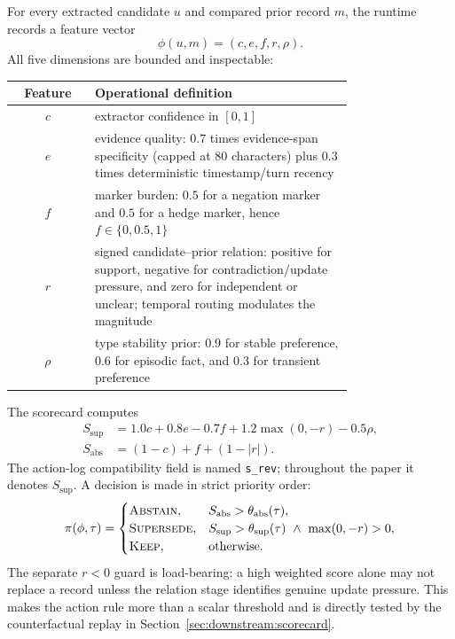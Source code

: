For every extracted candidate $u$ and compared prior record $m$, the runtime
records a feature vector
\[
\phi(u,m)=(c,e,f,r,\rho).
\]
All five dimensions are bounded and inspectable:
\begin{center}
\small
\begin{tabular}{@{}c p{0.76\linewidth}@{}}
\toprule
Feature & Operational definition \\
\midrule
$c$ & extractor confidence in $[0,1]$ \\
$e$ & evidence quality: $0.7$ times evidence-span specificity (capped at
80 characters) plus $0.3$ times deterministic timestamp/turn recency \\
$f$ & marker burden: $0.5$ for a negation marker and $0.5$ for a hedge
marker, hence $f\in\{0,0.5,1\}$ \\
$r$ & signed candidate--prior relation: positive for support, negative for
contradiction/update pressure, and zero for independent or unclear; temporal
routing modulates the magnitude \\
$\rho$ & type stability prior: $0.9$ for stable preference, $0.6$ for
episodic fact, and $0.3$ for transient preference \\
\bottomrule
\end{tabular}
\end{center}

The scorecard computes
\begin{align}
S_{\mathrm{sup}} &=
1.0c + 0.8e - 0.7f + 1.2\max(0,-r) - 0.5\rho, \\
S_{\mathrm{abs}} &= (1-c) + f + (1-|r|).
\end{align}
The action-log compatibility field is named \texttt{s\_rev}; throughout the
paper it denotes $S_{\mathrm{sup}}$. A decision is made in strict priority
order:
\begin{equation}
\pi(\phi,\tau)=
\begin{cases}
\textsc{Abstain}, & S_{\mathrm{abs}}>\theta_{\mathrm{abs}}(\tau),\\
\textsc{Supersede}, & S_{\mathrm{sup}}>\theta_{\mathrm{sup}}(\tau)
               \ \wedge\ \max(0,-r)>0,\\
\textsc{Keep}, & \text{otherwise.}
\end{cases}
\label{eq:scorecard}
\end{equation}
The separate $r<0$ guard is load-bearing: a high weighted score alone may not
replace a record unless the relation stage identifies genuine update pressure.
This makes the action rule more than a scalar threshold and is directly tested
by the counterfactual replay in Section~\ref{sec:downstream:scorecard}.

